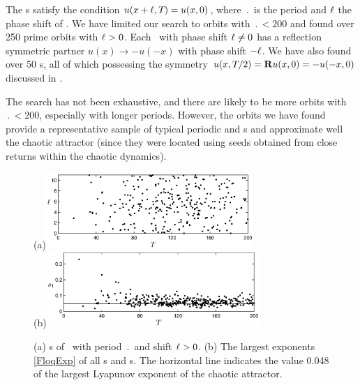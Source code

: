 

The \rpo s satisfy the condition $u(x+\ell,{T_{}}) = u(x,0)$,
where $\period{}$ is the period and $\ell$ the phase shift of \rpo .
We have limited our search to orbits with $\period{} < 200$ and found
over 250 prime orbits with $\ell > 0$.  Each \rpo\ with phase shift
$\ell \neq 0$ has a reflection symmetric partner
$u(x) \to -u(-x)$ with phase shift $-\ell$.  We have also found over
50 \po s, all of which possessing the symmetry $u(x,{T_{}}/2) =
{\bf R} u(x,0) = -u(-x,0)$ discussed in .

The search has not been exhaustive, and there are likely to be more
orbits with $\period{} < 200$, especially with longer periods.
However, the orbits we have found provide a representative sample of
typical periodic and \rpo s and approximate well the chaotic
attractor (since they were located using seeds obtained from close
returns within the chaotic dynamics).

\begin{figure}[t]
\begin{center}
(a)\hspace{1ex}\includegraphics[width=0.7\textwidth]{figs/ks22_rpos_Tdelta.eps}\\
(b)\includegraphics[width=0.72\textwidth]{figs/ks22_rpos_lyap.eps}
\end{center}
\caption{
(a) \Rpo s of \KSe\ with period $\period{}$ and shift
$\ell > 0$.
(b) The largest  exponents \ref{FloqExp} of all \po s
and \rpo s.  The horizontal
line indicates the value 0.048 of the largest Lyapunov exponent
of the chaotic attractor.
} \label{f:ks22rposT}
\end{figure}

